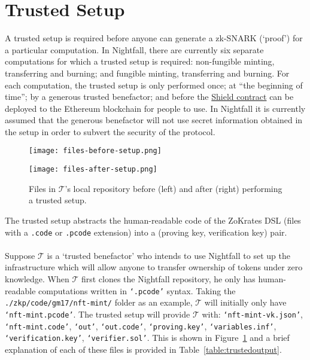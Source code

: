 \section{Trusted Setup}
\label{sec:trustedSetup}

A trusted setup is required before anyone can generate a zk-SNARK (`proof') for a particular computation. In Nightfall, there are currently six separate computations for which a trusted setup is required: non-fungible minting, transferring and burning; and fungible minting, transferring and burning.
For each computation, the trusted setup is only performed once; at ``the beginning of time''; by a generous trusted benefactor; and before the \hyperref[sec:smartContracts]{Shield contract} can be deployed to the Ethereum blockchain for people to use. 
In Nightfall it is currently assumed that the generous benefactor will not use secret information obtained in the setup in order to subvert the security of the protocol.

\begin{figure}[h]
	\centering
	\begin{minipage}{0.3\textwidth}
		\centering
		\texttt{[image: files-before-setup.png]}
	\end{minipage}
	\quad
	\begin{minipage}{0.3\textwidth}
		\centering
		\texttt{[image: files-after-setup.png]}
	\end{minipage}
	\smallbreak
	\caption{Files in $\mathcal{T}$'s local repository before (left) and after (right) performing a trusted setup.}
	\label{pic:filesBeforeAfterSetup}
\end{figure}

The trusted setup abstracts the human-readable code of the ZoKrates DSL (files with a \texttt{.code} or \texttt{.pcode} extension) into a (proving key, verification key) pair.\\
\\
Suppose $\mathcal{T}$ is a `trusted benefactor' who intends to use Nightfall to set up the infrastructure which will allow anyone to transfer ownership of tokens under zero knowledge.
When $\mathcal{T}$ first clones the Nightfall repository, he only has human-readable computations written in \texttt{`.pcode'} syntax. Taking the \texttt{./zkp/code/gm17/nft-mint/} folder as an example, $\mathcal{T}$ will initially only have
\texttt{`nft-mint.pcode'}.  
The trusted setup will provide $\mathcal{T}$ with:
\texttt{`nft-mint-vk.json'}, \texttt{`nft-mint.code'},
\texttt{`out'}, \texttt{`out.code'}, \texttt{`proving.key'},
\texttt{`variables.inf'}, \texttt{`verification.key'},
\texttt{`verifier.sol'}.
This is shown in Figure~\ref{pic:filesBeforeAfterSetup} and a brief explanation of each of these files is provided in Table~\ref{table:trustedoutput}.

